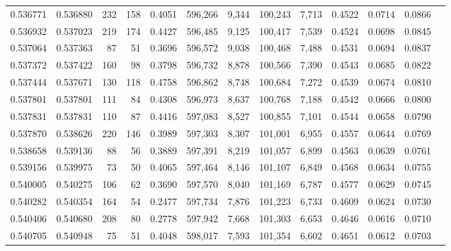 \begin{tabular}{rrrrrrrrrrrrr}
0.536771 & 0.536880 &   232 &   158 &                                     0.4051 & 596,266 &   9,344 & 100,243 &   7,713 & 0.4522 & 0.0714 & 0.0866 \\
0.536932 & 0.537023 &   219 &   174 &                                     0.4427 & 596,485 &   9,125 & 100,417 &   7,539 & 0.4524 & 0.0698 & 0.0845 \\
0.537064 & 0.537363 &    87 &    51 &                                     0.3696 & 596,572 &   9,038 & 100,468 &   7,488 & 0.4531 & 0.0694 & 0.0837 \\
0.537372 & 0.537422 &   160 &    98 &                                     0.3798 & 596,732 &   8,878 & 100,566 &   7,390 & 0.4543 & 0.0685 & 0.0822 \\
0.537444 & 0.537671 &   130 &   118 &                                     0.4758 & 596,862 &   8,748 & 100,684 &   7,272 & 0.4539 & 0.0674 & 0.0810 \\
0.537801 & 0.537801 &   111 &    84 &                                     0.4308 & 596,973 &   8,637 & 100,768 &   7,188 & 0.4542 & 0.0666 & 0.0800 \\
0.537831 & 0.537831 &   110 &    87 &                                     0.4416 & 597,083 &   8,527 & 100,855 &   7,101 & 0.4544 & 0.0658 & 0.0790 \\
0.537870 & 0.538626 &   220 &   146 &                                     0.3989 & 597,303 &   8,307 & 101,001 &   6,955 & 0.4557 & 0.0644 & 0.0769 \\
0.538658 & 0.539136 &    88 &    56 &                                     0.3889 & 597,391 &   8,219 & 101,057 &   6,899 & 0.4563 & 0.0639 & 0.0761 \\
0.539156 & 0.539975 &    73 &    50 &                                     0.4065 & 597,464 &   8,146 & 101,107 &   6,849 & 0.4568 & 0.0634 & 0.0755 \\
0.540005 & 0.540275 &   106 &    62 &                                     0.3690 & 597,570 &   8,040 & 101,169 &   6,787 & 0.4577 & 0.0629 & 0.0745 \\
0.540282 & 0.540354 &   164 &    54 &                                     0.2477 & 597,734 &   7,876 & 101,223 &   6,733 & 0.4609 & 0.0624 & 0.0730 \\
0.540406 & 0.540680 &   208 &    80 &                                     0.2778 & 597,942 &   7,668 & 101,303 &   6,653 & 0.4646 & 0.0616 & 0.0710 \\
0.540705 & 0.540948 &    75 &    51 &                                     0.4048 & 598,017 &   7,593 & 101,354 &   6,602 & 0.4651 & 0.0612 & 0.0703 \\

\end{tabular}
